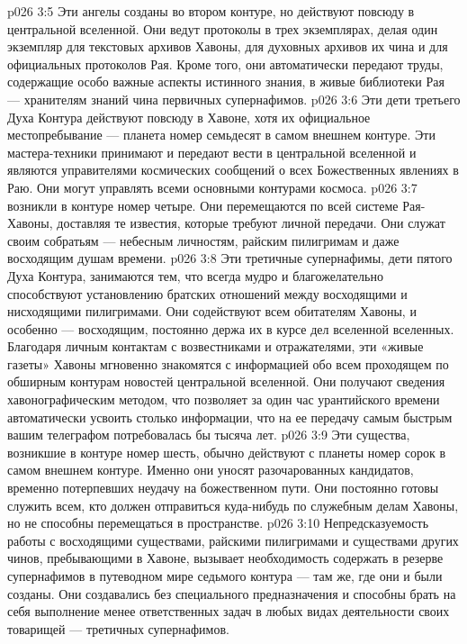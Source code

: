 \vs p026 3:5 \bibnobreakspace {} Эти ангелы созданы во втором контуре, но действуют повсюду в центральной вселенной. Они ведут протоколы в трех экземплярах, делая один экземпляр для текстовых архивов Хавоны, для духовных архивов их чина и для официальных протоколов Рая. Кроме того, они автоматически передают труды, содержащие особо важные аспекты истинного знания, в живые библиотеки Рая --- хранителям знаний чина первичных супернафимов.
\vs p026 3:6 \bibnobreakspace {} Эти дети третьего Духа Контура действуют повсюду в Хавоне, хотя их официальное местопребывание --- планета номер семьдесят в самом внешнем контуре. Эти мастера\hyp{}техники принимают и передают вести в центральной вселенной и являются управителями космических сообщений о всех Божественных явлениях в Раю. Они могут управлять всеми основными контурами космоса.
\vs p026 3:7 \bibnobreakspace {} возникли в контуре номер четыре. Они перемещаются по всей системе Рая\hyp{}Хавоны, доставляя те известия, которые требуют личной передачи. Они служат своим собратьям --- небесным личностям, райским пилигримам и даже восходящим душам времени.
\vs p026 3:8 \bibnobreakspace {} Эти третичные супернафимы, дети пятого Духа Контура, занимаются тем, что всегда мудро и благожелательно способствуют установлению братских отношений между восходящими и нисходящими пилигримами. Они содействуют всем обитателям Хавоны, и особенно --- восходящим, постоянно держа их в курсе дел вселенной вселенных. Благодаря личным контактам с возвестниками и отражателями, эти «живые газеты» Хавоны мгновенно знакомятся с информацией обо всем проходящем по обширным контурам новостей центральной вселенной. Они получают сведения хавонографическим методом, что позволяет за один час урантийского времени автоматически усвоить столько информации, что на ее передачу самым быстрым вашим телеграфом потребовалась бы тысяча лет.
\vs p026 3:9 \bibnobreakspace {} Эти существа, возникшие в контуре номер шесть, обычно действуют с планеты номер сорок в самом внешнем контуре. Именно они уносят разочарованных кандидатов, временно потерпевших неудачу на божественном пути. Они постоянно готовы служить всем, кто должен отправиться куда\hyp{}нибудь по служебным делам Хавоны, но не способны перемещаться в пространстве.
\vs p026 3:10 \bibnobreakspace {} Непредсказуемость работы с восходящими существами, райскими пилигримами и существами других чинов, пребывающими в Хавоне, вызывает необходимость содержать в резерве супернафимов в путеводном мире седьмого контура --- там же, где они и были созданы. Они создавались без специального предназначения и способны брать на себя выполнение менее ответственных задач в любых видах деятельности своих товарищей --- третичных супернафимов.
